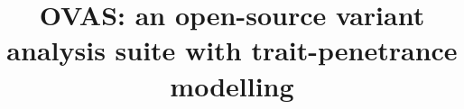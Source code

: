 \documentclass[twocolumn]{bmcart}%
\def\app{OVAS}
\begin{document}
\begin{frontmatter}

\begin{fmbox}


\title{\app{}: an open-source variant analysis suite with trait-penetrance modelling}


\author[
   addressref={aff1},                   %
   email={},   							%
   noteref={n1}
]{\inits{} }
\author[
   addressref={aff1},
   email={m.tekman@ucl.ac.uk},
   noteref={n1}
]{\inits{} }
\author[
   addressref={aff2},
   email={}
]{ }
\author[
   addressref={aff1},
   email={}
]{\inits{} }
\author[
   addressref={aff1},
      corref={aff1},
   email={r.kleta@ucl.ac.uk}
]{\inits{} }
\author[
   addressref={aff1},
   email={h.stanescu@ucl.ac.uk}
]{\inits{} }

 
\address[id=aff1]{%
  , %
}
\address[id=aff2]{%
  ,
  ,
}


\end{fmbox}
\end{frontmatter}
\end{document}
